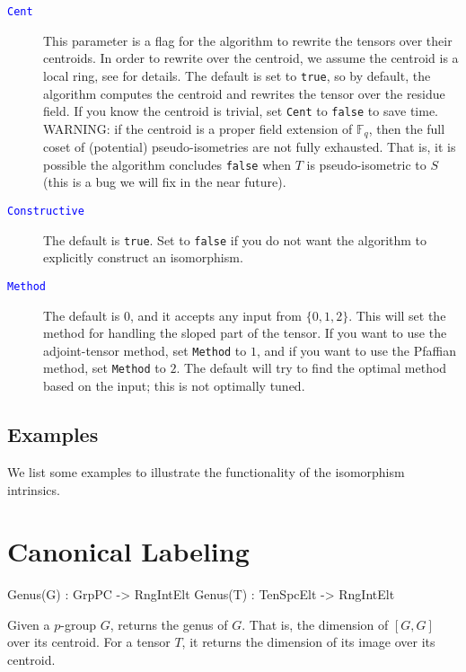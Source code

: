 \documentclass{documentation}
\begin{document}
\begin{description}
\item[\textcolor{blue}{\tt Cent}]
This parameter is a flag for the algorithm to rewrite the tensors over their centroids. 
In order to rewrite over the centroid, we assume the centroid is a local ring, see \cite{eMAGma} for details.
The default is set to {\tt true}, so by default, the algorithm computes the centroid and rewrites the tensor over the residue field.
If you know the centroid is trivial, set {\tt Cent} to {\tt false} to save time.
WARNING: if the centroid is a proper field extension of $\mathbb{F}_q$, then the full coset of (potential) pseudo-isometries are not fully exhausted. 
That is, it is possible the algorithm concludes {\tt false} when $T$ is pseudo-isometric to $S$ (this is a bug we will fix in the near future).
\item[\textcolor{blue}{\tt Constructive}]
The default is {\tt true}. 
Set to {\tt false} if you do not want the algorithm to explicitly construct an isomorphism.
\item[\textcolor{blue}{\tt Method}]
The default is $0$, and it accepts any input from $\{ 0,1,2\}$. 
This will set the method for handling the sloped part of the tensor.
If you want to use the adjoint-tensor method, set {\tt Method} to $1$, and if you want to use the Pfaffian method, set {\tt Method} to $2$. The default will try to find the optimal method based on the input; this is not optimally tuned.
\end{description}


\section{Examples}
We list some examples to illustrate the functionality of the isomorphism intrinsics.


\chapter{Canonical Labeling}

\begin{intrinsics}
Genus(G) : GrpPC -> RngIntElt
Genus(T) : TenSpcElt -> RngIntElt
\end{intrinsics}

Given a $p$-group $G$, returns the genus of $G$. 
That is, the dimension of $[G,G]$ over its centroid.
For a tensor $T$, it returns the dimension of its image over its centroid. 
\end{document}
